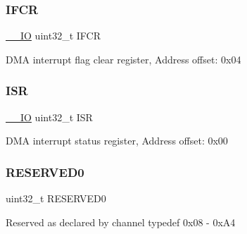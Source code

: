 \subsubsection{\texorpdfstring{I\+F\+CR}{IFCR}}
{\footnotesize\ttfamily \hyperlink{core__sc300_8h_aec43007d9998a0a0e01faede4133d6be}{\+\_\+\+\_\+\+IO} uint32\+\_\+t I\+F\+CR}

D\+MA interrupt flag clear register, Address offset\+: 0x04 \mbox{\label{struct_d_m_a___type_def_ab3c49a96815fcbee63d95e1e74f20e75}} 
\subsubsection{\texorpdfstring{I\+SR}{ISR}}
{\footnotesize\ttfamily \hyperlink{core__sc300_8h_aec43007d9998a0a0e01faede4133d6be}{\+\_\+\+\_\+\+IO} uint32\+\_\+t I\+SR}

D\+MA interrupt status register, Address offset\+: 0x00 \mbox{\label{struct_d_m_a___type_def_a307990146f8d06c47db79a8ea23c4251}} 
\subsubsection{\texorpdfstring{R\+E\+S\+E\+R\+V\+E\+D0}{RESERVED0}}
{\footnotesize\ttfamily uint32\+\_\+t R\+E\+S\+E\+R\+V\+E\+D0}

Reserved as declared by channel typedef 0x08 -\/ 0x\+A4 


